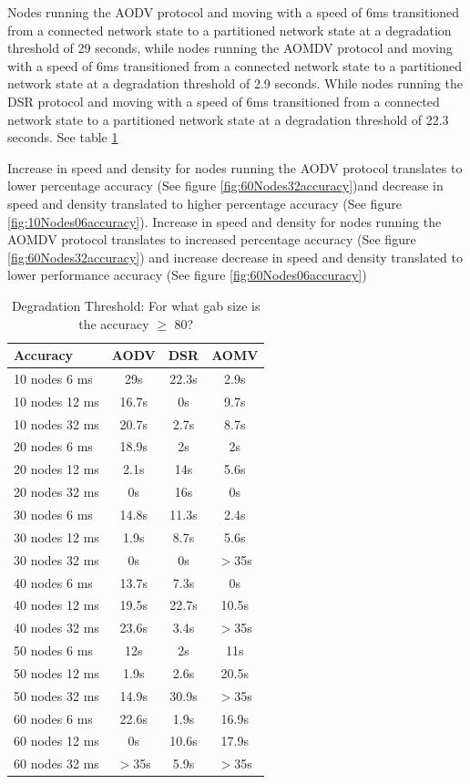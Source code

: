 \documentclass[letterpaper, 10 pt, conference]{ieeeconf}  %
\begin{document}
Nodes running the AODV protocol and moving with a speed of 6ms transitioned from a connected network state to a partitioned network state at a degradation threshold of 29 seconds, while nodes running the AOMDV protocol and moving with a speed of 6ms transitioned from a connected network state to a partitioned network state at a degradation threshold of 2.9 seconds. While nodes running the DSR protocol and moving with a speed of 6ms transitioned from a connected network state to a partitioned network state at a degradation threshold of 22.3 seconds. See table \ref{table:6}

Increase in speed and density for nodes running the AODV protocol translates to lower percentage accuracy (See figure \ref{fig:60Nodes32accuracy})and decrease in speed and density translated to higher percentage accuracy (See figure \ref{fig:10Nodes06accuracy}). Increase in speed and density for nodes running the AOMDV protocol translates to increased percentage accuracy (See figure \ref{fig:60Nodes32accuracy}) and increase decrease in speed and density translated to lower performance accuracy (See figure \ref{fig:60Nodes06accuracy})

\begin{table}[hbt!]
\caption{Degradation Threshold: For what gab size is the accuracy $\geq$ 80?}

\centering
\begin{tabular}{|l|c|c|c|}
\hline
\textbf{Accuracy} & \textbf{AODV} & \textbf{DSR} & \textbf{AOMV} \\ \hline
10 nodes 6 ms & 29s & 22.3s & 2.9s \\ \hline
10 nodes 12 ms & 16.7s & 0s & 9.7s \\ \hline
10 nodes 32 ms & 20.7s & 2.7s & 8.7s \\ \hline
20 nodes 6 ms & 18.9s  & 2s & 2s \\ \hline
20 nodes 12 ms & 2.1s & 14s & 5.6s \\ \hline
20 nodes 32 ms & 0s & 16s & 0s \\ \hline
30 nodes 6 ms & 14.8s & 11.3s & 2.4s \\ \hline
30 nodes 12 ms & 1.9s & 8.7s & 5.6s \\ \hline
30 nodes 32 ms & 0s & 0s & $>$35s \\ \hline
40 nodes 6 ms & 13.7s  & 7.3s & 0s \\ \hline
40 nodes 12 ms & 19.5s & 22.7s & 10.5s \\ \hline
40 nodes 32 ms & 23.6s & 3.4s & $>$35s \\ \hline
50 nodes 6 ms & 12s & 2s & 11s \\ \hline
50 nodes 12 ms & 1.9s & 2.6s & 20.5s \\ \hline
50 nodes 32 ms & 14.9s & 30.9s & $>$35s \\ \hline
60 nodes 6 ms & 22.6s  & 1.9s & 16.9s \\ \hline
60 nodes 12 ms & 0s & 10.6s & 17.9s \\ \hline
60 nodes 32 ms & $>$35s & 5.9s & $>$35s \\ \hline
\end{tabular}
\label{table:6}
\end{table}
\end{document}
